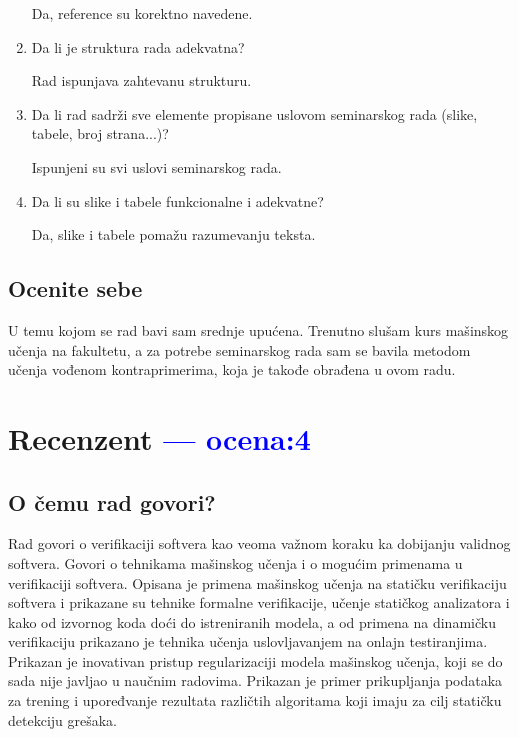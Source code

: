 \documentclass[a4paper]{report}
\newcommand{\odgovor}[1]{\textcolor{blue}{#1}}
\begin{document}
\begin{enumerate}
Da, reference su korektno navedene.

\item Da li je struktura rada adekvatna?

Rad ispunjava zahtevanu strukturu.

\item Da li rad sadrži sve elemente propisane uslovom seminarskog rada (slike, tabele, broj strana...)?

Ispunjeni su svi uslovi seminarskog rada.

\item Da li su slike i tabele funkcionalne i adekvatne?

Da, slike i tabele pomažu razumevanju teksta.

\end{enumerate}

\section{Ocenite sebe}

U temu kojom se rad bavi sam srednje upućena. Trenutno slušam kurs mašinskog učenja na fakultetu, a za potrebe seminarskog rada sam se bavila metodom učenja vođenom kontraprimerima, koja je takođe obrađena u ovom radu.


\chapter{Recenzent \odgovor{--- ocena:4} }


\section{O čemu rad govori?}
Rad govori o verifikaciji softvera kao veoma važnom koraku ka dobijanju validnog softvera.
Govori o tehnikama mašinskog učenja i o mogućim primenama u verifikaciji softvera.
Opisana je primena mašinskog učenja na statičku verifikaciju softvera i prikazane su
tehnike formalne verifikacije, učenje statičkog analizatora i kako
od izvornog koda doći do istreniranih modela, a od primena na dinamičku
verifikaciju prikazano je tehnika učenja uslovljavanjem na onlajn testiranjima.
Prikazan je inovativan pristup regularizaciji modela mašinskog učenja, koji se do sada nije javljao
u naučnim radovima.
Prikazan je primer prikupljanja podataka za trening i upoređvanje rezultata različtih algoritama koji imaju za cilj
statičku detekciju grešaka.
\end{document}
